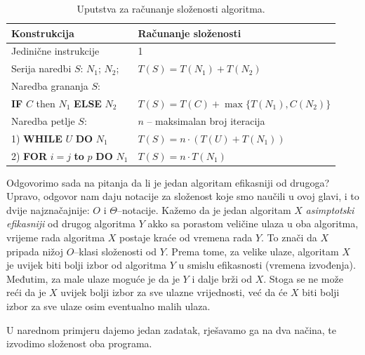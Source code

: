 \begin{table}[H]
		\caption{Uputstva za računanje složenosti algoritma.}  \label{tab:uputstva_racunanje}
	\centering
	\begin{tabular}{l |l} \hline 
		\textbf{Konstrukcija}         & \textbf{Računanje složenosti} \\ \hline
		Jedinične instrukcije         & 1 \\
        Serija naredbi $S$: $N_1$; $N_2$; &  $T(S) = T(N_1) + T(N_2)$  \\ \hline
        Naredba grananja $S$:           &                                \\
        \textbf{IF}  $C$ then $N_1$ \textbf{ELSE} $N_2$  & $T(S) = T(C) + \max\{ T(N_1), C(N_2)\}$  \\          \hline                 
         Naredba petlje $S$:            &   $n$ -- maksimalan broj iteracija          \\
         1) \textbf{WHILE} $U$ \textbf{DO} $N_1$                 &     $T(S)= n \cdot (T(U) + T(N_1))$         \\ 
         2) \textbf{FOR} $i=j$ \textbf{to} $p$ \textbf{DO} $N_1$  &    $T(S)= n\cdot T(N_1)$     \\  \hline
         
	\end{tabular}
\end{table}

Odgovorimo sada na pitanja da li je jedan algoritam efikasniji od drugoga?
Upravo, odgovor nam daju notacije za složenost koje smo naučili u ovoj glavi, i to dvije najznačajnije: $O$ i $\Theta$--notacije. Kažemo da je jedan algoritam $X$ \textit{asimptotski efikasniji} od drugog algoritma  $Y$ akko sa porastom veličine ulaza u oba algoritma, vrijeme rada algoritma $X$ postaje kraće od vremena rada $Y$. To znači da $X$ pripada nižoj $O$--klasi složenosti od $Y$. %
Prema tome, za velike ulaze, algoritam $X$ je uvijek biti bolji izbor od  algoritma $Y$ u smislu efikasnosti (vremena izvođenja). Međutim, za male ulaze moguće je da je $Y$ i dalje brži od $X$. Stoga se ne može reći da je $X$ uvijek bolji izbor za sve ulazne vrijednosti, već da će $X$ biti bolji izbor za sve ulaze osim eventualno malih ulaza.


U narednom primjeru dajemo jedan zadatak, rješavamo ga na dva načina, te izvodimo složenost oba programa.

